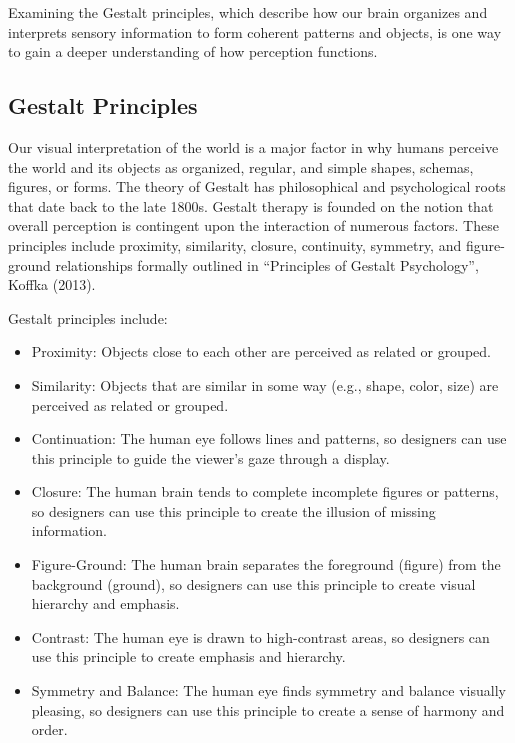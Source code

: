 \documentclass[print]{nuthesis}
\providecommand{\tightlist}{%
  \setlength{\itemsep}{0pt}\setlength{\parskip}{0pt}}
\begin{document}
Examining the Gestalt principles, which describe how our brain organizes and interprets sensory information to form coherent patterns and objects, is one way to gain a deeper understanding of how perception functions.

\hypertarget{gestalt-principles}{%
\subsection{Gestalt Principles}\label{gestalt-principles}}

Our visual interpretation of the world is a major factor in why humans perceive the world and its objects as organized, regular, and simple shapes, schemas, figures, or forms.
The theory of Gestalt has philosophical and psychological roots that date back to the late 1800s.
Gestalt therapy is founded on the notion that overall perception is contingent upon the interaction of numerous factors.
These principles include proximity, similarity, closure, continuity, symmetry, and figure-ground relationships formally outlined in ``Principles of Gestalt Psychology'', Koffka (2013).

Gestalt principles include:

\begin{itemize}
\tightlist
\item
  Proximity: Objects close to each other are perceived as related or grouped.
\item
  Similarity: Objects that are similar in some way (e.g., shape, color, size) are perceived as related or grouped.
\item
  Continuation: The human eye follows lines and patterns, so designers can use this principle to guide the viewer's gaze through a display.
\item
  Closure: The human brain tends to complete incomplete figures or patterns, so designers can use this principle to create the illusion of missing information.
\item
  Figure-Ground: The human brain separates the foreground (figure) from the background (ground), so designers can use this principle to create visual hierarchy and emphasis.
\item
  Contrast: The human eye is drawn to high-contrast areas, so designers can use this principle to create emphasis and hierarchy.
\item
  Symmetry and Balance: The human eye finds symmetry and balance visually pleasing, so designers can use this principle to create a sense of harmony and order.
\end{itemize}
\end{document}
